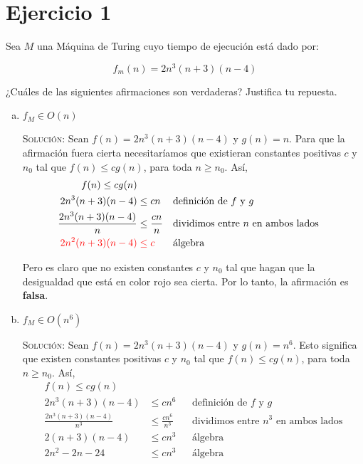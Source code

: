 \documentclass[12pt,letterpaper]{article}
\begin{document}
\section*{Ejercicio 1}
Sea $M$ una Máquina de Turing cuyo tiempo de ejecución está dado por:

$$f_m(n) = 2n^3(n+3)(n-4)$$

¿Cuáles de las siguientes afirmaciones son verdaderas? Justifica tu repuesta.

\begin{enumerate}[a.]
    \item $f_M \in O(n)$

    \textsc{Solución:} Sean $f(n) = 2n^3(n+3)(n-4)$ y $g(n) = n$. Para que la 
    afirmación fuera cierta necesitaríamos que existieran constantes positivas 
    $c$ y $n_0$ tal que $f(n) \leq cg(n)$, para toda $n \geq n_0$. Así, 
    \begin{align*}
        f(n) \leq cg(n) \\
        2n^3(n+3)(n-4) &\leq cn 
        && \text{definición de $f$ y $g$} \\
        \frac{2n^3(n+3)(n-4)}{n} &\leq \frac{cn}{n} 
        && \text{dividimos entre $n$ en ambos lados} \\ 
        \color{red}2n^2(n+3)(n-4) &\color{red}\leq \color{red} c
        && \text{álgebra}
    \end{align*}

    Pero es claro que no existen constantes $c$ y $n_0$ tal que hagan que la
    desigualdad que está en color rojo sea cierta. Por lo tanto, la afirmación
    es \textbf{falsa}.

    \item $f_M \in O(n^6)$ 

    \textsc{Solución:} Sean $f(n) = 2n^3(n+3)(n-4)$ y $g(n) = n^6$. Esto 
    significa que existen constantes positivas $c$ y $n_0$ tal que 
    $f(n) \leq cg(n)$, para toda $n \geq n_0$. Así, 
    \begin{align*}
        f(n) \leq cg(n) \\
        2n^3(n+3)(n-4) &\leq cn^6
        && \text{definición de $f$ y $g$} \\
        \frac{2n^3(n+3)(n-4)}{n^3} &\leq \frac{cn^6}{n^3} 
        && \text{dividimos entre $n^3$ en ambos lados} \\ 
        2(n+3)(n-4) &\leq cn^3
        && \text{álgebra} \\ 
        2n^2 - 2n -24 &\leq cn^3
        && \text{álgebra}
    \end{align*}


\end{enumerate}
\end{document}
